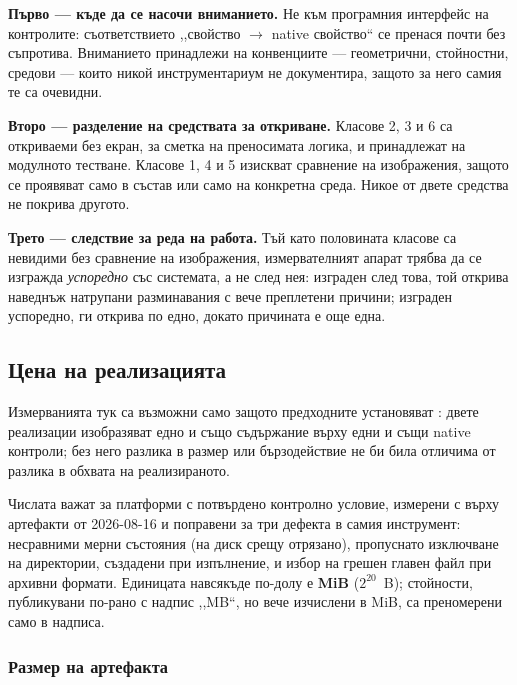 \textbf{Първо --- къде да се насочи вниманието.} Не към програмния интерфейс на контролите:
съответствието ,,свойство $\rightarrow$ native свойство“ се пренася почти без съпротива. Вниманието
принадлежи на конвенциите --- геометрични, стойностни, средови --- които никой инструментариум не
документира, защото за него самия те са очевидни.

\textbf{Второ --- разделение на средствата за откриване.} Класове 2, 3 и 6 са откриваеми без екран,
за сметка на преносимата логика, и принадлежат на модулното тестване. Класове 1, 4 и 5 изискват
сравнение на изображения, защото се проявяват само в състав или само на конкретна среда. Никое от
двете средства не покрива другото.

\textbf{Трето --- следствие за реда на работа.} Тъй като половината класове са невидими без
сравнение на изображения, измервателният апарат трябва да се изгражда \emph{успоредно} със
системата, а не след нея: изграден след това, той открива наведнъж натрупани разминавания с вече
преплетени причини; изграден успоредно, ги открива по едно, докато причината е още една.

\subsection{Цена на реализацията}
\label{subsec:cost}

Измерванията тук са възможни само защото предходните установяват : двете
реализации изобразяват едно и също съдържание върху едни и същи native контроли; без него разлика в
размер или бързодействие не би била отличима от разлика в обхвата на реализираното.

Числата важат за платформи с потвърдено контролно условие, измерени с  върху
артефакти от 2026-08-16 и поправени за три дефекта в самия инструмент: несравними мерни състояния
(на диск срещу отрязано), пропуснато изключване на директории, създадени при изпълнение, и избор на
грешен главен файл при архивни формати. Единицата навсякъде по-долу е \textbf{MiB} ($2^{20}$~B);
стойности, публикувани по-рано с надпис ,,MB“, но вече изчислени в MiB, са преномерени само в
надписа.

\subsubsection{Размер на артефакта}

